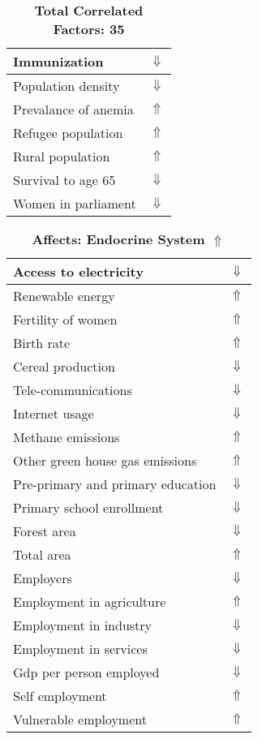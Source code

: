 \documentclass[12pt,notitlepage,oneside]{report}
\begin{document}
\begin{table}[!htb]
\begin{tabular}{|l|l|}
Immunization & $\Downarrow$\\ \hline
Population density & $\Downarrow$\\ \hline
Prevalance of anemia & $\Uparrow$\\ \hline
Refugee population & $\Uparrow$\\ \hline
Rural population & $\Uparrow$\\ \hline
Survival to age 65 & $\Downarrow$\\ \hline
Women in parliament & $\Downarrow$\\ \hline
\end{tabular}
\caption*{\textbf{Total Correlated Factors: 35}}
\end{table}
\clearpage
\begin{table}[!htb]
\caption{\textbf{Affects: Endocrine System $\Uparrow$}}
\centering
\label{Correlated Socio-economic Factors0}
\begin{tabular}{|l|l|}
\hline
Access to electricity & $\Downarrow$\\ \hline
Renewable energy & $\Uparrow$\\ \hline
Fertility of women & $\Uparrow$\\ \hline
Birth rate & $\Uparrow$\\ \hline
Cereal production & $\Downarrow$\\ \hline
Tele-communications & $\Downarrow$\\ \hline
Internet usage & $\Downarrow$\\ \hline
Methane emissions & $\Uparrow$\\ \hline
Other green house gas emissions & $\Uparrow$\\ \hline
Pre-primary and primary education & $\Downarrow$\\ \hline
Primary school enrollment & $\Downarrow$\\ \hline
Forest area & $\Downarrow$\\ \hline
Total area & $\Uparrow$\\ \hline
Employers & $\Downarrow$\\ \hline
Employment in agriculture & $\Uparrow$\\ \hline
Employment in industry & $\Downarrow$\\ \hline
Employment in services & $\Downarrow$\\ \hline
Gdp per person employed & $\Downarrow$\\ \hline
Self employment & $\Uparrow$\\ \hline
Vulnerable employment & $\Uparrow$\\ \hline

\end{tabular}
\end{table}
\end{document}
